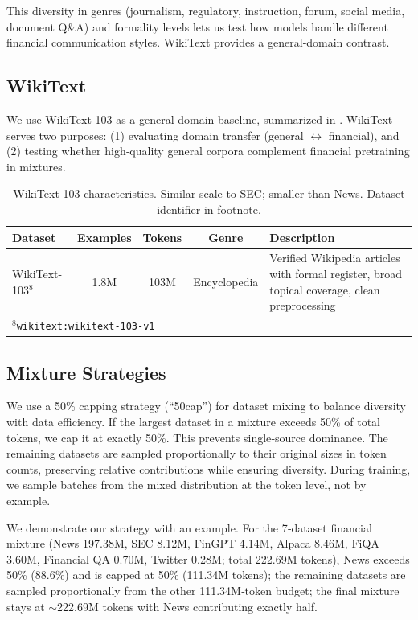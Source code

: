 This diversity in genres (journalism, regulatory, instruction, forum, social media, document Q\&A) and formality levels lets us test how models handle different financial communication styles. WikiText provides a general‑domain contrast.

\subsection{WikiText}

We use WikiText‑103 \parencite{merity2016pointer} as a general‑domain baseline, summarized in . WikiText serves two purposes: (1) evaluating domain transfer (general $\leftrightarrow$ financial), and (2) testing whether high‑quality general corpora complement financial pretraining in mixtures.

\begin{table}[h]
\centering
\caption[WikiText Dataset Characteristics]{WikiText-103 characteristics. Similar scale to SEC; smaller than News. Dataset identifier in footnote.}
\label{tab:wikitext_dataset}
\small
\begin{tabular}{p{3.4cm}cccp{5.5cm}}
\toprule
\textbf{Dataset} & \textbf{Examples} & \textbf{Tokens} & \textbf{Genre} & \textbf{Description} \\
\midrule
WikiText-103$^8$ & 1.8M & 103M & Encyclopedia & Verified Wikipedia articles with formal register, broad topical coverage, clean preprocessing \\
\bottomrule
\multicolumn{5}{l}{\footnotesize $^8$\texttt{wikitext:wikitext-103-v1}}
\end{tabular}
\end{table}

\subsection{Mixture Strategies}

We use a 50\% capping strategy (``50cap'') for dataset mixing to balance diversity with data efficiency. If the largest dataset in a mixture exceeds 50\% of total tokens, we cap it at exactly 50\%. This prevents single‑source dominance. The remaining datasets are sampled proportionally to their original sizes in token counts, preserving relative contributions while ensuring diversity. During training, we sample batches from the mixed distribution at the token level, not by example.

We demonstrate our strategy with an example. For the 7‑dataset financial mixture (News 197.38M, SEC 8.12M, FinGPT 4.14M, Alpaca 8.46M, FiQA 3.60M, Financial QA 0.70M, Twitter 0.28M; total 222.69M tokens), News exceeds 50\% (88.6\%) and is capped at 50\% (111.34M tokens); the remaining datasets are sampled proportionally from the other 111.34M‑token budget; the final mixture stays at $\sim$222.69M tokens with News contributing exactly half.

